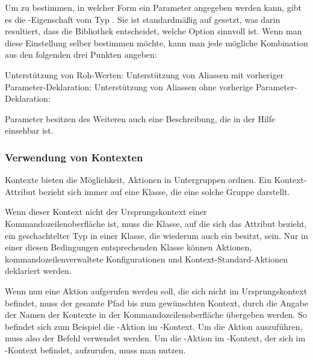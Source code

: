 Um zu bestimmen, in welcher Form ein Parameter angegeben werden kann, gibt es die -Eigenschaft vom Typ .
Sie ist standardmäßig auf  gesetzt, was darin resultiert, dass die Bibliothek entscheidet, welche Option sinnvoll ist.
Wenn man diese Einstellung selber bestimmen möchte, kann man jede mögliche Kombination aus den folgenden drei Punkten angeben:
\begin{outline}
 \1 Unterstützung von Roh-Werten: 
 \1 Unterstützung von Aliassen mit vorheriger Parameter-Deklaration: 
 \1 Unterstützung von Aliassen ohne vorherige Parameter-Deklaration: 
\end{outline}

Parameter besitzen des Weiteren auch eine Beschreibung, die in der Hilfe einsehbar ist.

\subsubsection{Verwendung von Kontexten}
Kontexte bieten die Möglichkeit, Aktionen in Untergruppen ordnen.
Ein Kontext-Attribut bezieht sich immer auf eine Klasse, die eine solche Gruppe darstellt.

Wenn dieser Kontext nicht der Ursprungskontext einer Kommandozeilenoberfläche ist, 
muss die Klasse, auf die sich das Attribut bezieht, ein geschachtelter Typ in einer Klasse, die wiederum auch ein  besitzt, sein.
Nur in einer diesen Bedingungen entsprechenden Klasse können Aktionen, kommandozeilenverwaltete Konfigurationen und Kontext-Standard-Aktionen deklariert werden.

Wenn nun eine Aktion aufgerufen werden soll, die sich nicht im Ursprungskontext befindet,
muss der gesamte Pfad bis zum gewünschten Kontext, durch die Angabe der Namen der Kontexte in der Kommandozeilenoberfläche übergeben werden.
So befindet sich zum Beispiel die -Aktion im -Kontext.
Um die Aktion auszuführen, muss also der Befehl  verwendet werden.
Um die -Aktion im -Kontext, der sich im -Kontext befindet,
aufzurufen, muss man  nutzen.

